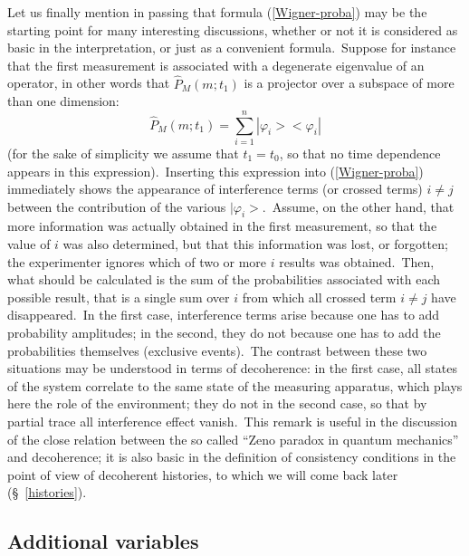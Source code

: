 \documentclass[12pt,onecolumn]{article}%
\begin{document}
Let us finally mention in passing that formula (\ref{Wigner-proba}) may be the
starting point for many interesting discussions, whether or not it is
considered as basic in the interpretation, or just as a convenient
formula.\ Suppose for instance that the first measurement is associated with a
degenerate eigenvalue of an operator, in other words that $\widehat{P}%
_{M}(m;t_{1})$ is a projector over a subspace of more than one dimension:%
\begin{equation}
\widehat{P}_{M}(m;t_{1})=\sum_{i=1}^{n}|\varphi_{i}><\varphi_{i}%
|\label{proj}%
\end{equation}
(for the sake of simplicity we assume that $t_{1}=t_{0}$, so that no time
dependence appears in this expression).\ Inserting this expression into
(\ref{Wigner-proba}) immediately shows the appearance of interference terms
(or crossed terms) $i\neq j$ between the contribution of the various
$|\varphi_{i}>$.\ Assume, on the other hand, that more information was
actually obtained in the first measurement, so that the value of $i$ was also
determined, but that this information was lost, or forgotten; the experimenter
ignores which of two or more $i$ results was obtained.\ Then, what should be
calculated is the sum of the probabilities associated with each possible
result, that is a single sum over $i$ from which all crossed term $i\neq j$
have disappeared.\ In the first case, interference terms arise because one has
to add probability amplitudes; in the second, they do not because one has to
add the probabilities themselves (exclusive events).\ The contrast between
these two situations may be understood in terms of decoherence: in the first
case, all states of the system correlate to the same state of the measuring
apparatus, which plays here the role of the environment; they do not in the
second case, so that by partial trace all interference effect vanish.\ This
remark is useful in the discussion of the close relation between the so called
``Zeno paradox in quantum mechanics'' \cite{Zeno} and decoherence; it is also
basic in the definition of consistency conditions in the point of view of
decoherent histories, to which we will come back later (\S \ \ref{histories}).

\subsection{Additional variables}

\label{additional}
\end{document}
